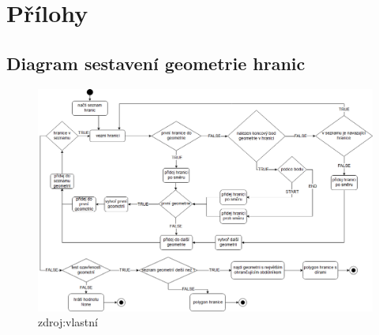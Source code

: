 \chapter{Přílohy}
\label{prilohy}
\section{Diagram sestavení geometrie hranic}
\begin{figure}[H]
	 \centering
      \includegraphics[width=15cm]{./pictures/Diagram_sestaveni_geometrie_hranic.png}
      \caption{zdroj:vlastní}
      \label{fig:logika_geometrie}
  \end{figure}
  
